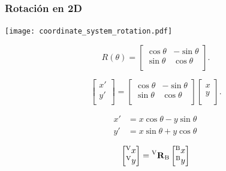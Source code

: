 \begin{frame}
    \frametitle{Rotación en 2D}

        \begin{center}
        \begin{minipage}{0.5\linewidth}
            \texttt{[image: coordinate\_system\_rotation.pdf]}
        \end{minipage}
        \hspace{1em}
        \begin{minipage}{0.38\linewidth}
            \begin{equation*}
                {\displaystyle R(\theta )={\begin{bmatrix}\cos \theta &-\sin \theta \\\sin \theta &\cos \theta \\\end{bmatrix}}.}
            \end{equation*}

            \begin{equation*}
                {\displaystyle {\begin{bmatrix}x'\\y'\\\end{bmatrix}}={\begin{bmatrix}\cos \theta &-\sin \theta \\\sin \theta &\cos \theta \\\end{bmatrix}}{\begin{bmatrix}x\\y\\\end{bmatrix}}.}
            \end{equation*}

            \begin{equation*}
                \begin{aligned}x'&=x\cos \theta -y\sin \theta \,\\y'&=x\sin \theta +y\cos \theta \,\end{aligned}
            \end{equation*}

            \begin{equation*}
                \begin{bmatrix}
                    \toCoord{x}{V}\\
                    \toCoord{y}{V}
                \end{bmatrix} =
                \rotationCoord{V}{B}
                \begin{bmatrix}
                    \toCoord{x}{B}\\
                    \toCoord{y}{B}
                \end{bmatrix}
            \end{equation*}
        \end{minipage}
    \end{center}
\end{frame}


